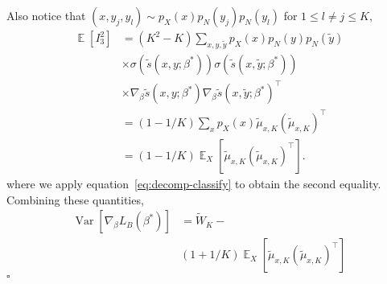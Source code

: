 \documentclass[11pt,a4paper]{article}
\newcommand{\qed}{\square}
\DeclareMathOperator{\E}{\mathbb{E}}
\newcommand{\var}{\operatorname{Var}}
\newcommand{\wt}[1]{\widetilde{#1}}
\newcommand{\gbeta}{\nabla_{\beta}}
\newcommand{\px}{p_X}
\newcommand{\sbc}[3]{\wt{s}(#1, #2; #3)}
\newcommand{\wbk}{\wt{W}_{K}}
\newcommand{\mubxk}{\wt{\mu}_{x, K}}
\begin{document}
Also notice that $(x, y_j, y_l) \sim \px(x)p_N(y_j)p_N(y_l)$ for $1\leq l\neq j \leq K$, 
\begin{equation*}
\begin{aligned}
\E[I_3^2] &= (K^2 - K)\sum_{x,y,\wt{y}}\px(x)p_N(y)p_N(\wt{y}) \\ 
& \times \sigma(\sbc{x}{y}{\beta^*})\sigma(\sbc{x}{\wt{y}}{\beta^*})\\
& \times \gbeta\sbc{x}{y}{\beta^*}\gbeta \sbc{x}{\wt{y}}{\beta^*}^\top\\
&= (1-1/K)\sum_{x} p_X(x) \mubxk  (\mubxk)^\top \\
& = (1-1/K)\E_X[\mubxk  (\mubxk)^\top].
\end{aligned}
\end{equation*}
where we apply equation~\eqref{eq:decomp-classify} to obtain the second equality. Combining these quantities, 
\begin{equation*}
\begin{aligned}
 \var \left[\gbeta L_B (\beta^*) \right]  & = \wbk  -  \\
 &  (1 + 1 / K)\E_{X}[\mubxk  (\mubxk)^\top ]
\end{aligned}
\end{equation*}
$\qed$
\end{document}
